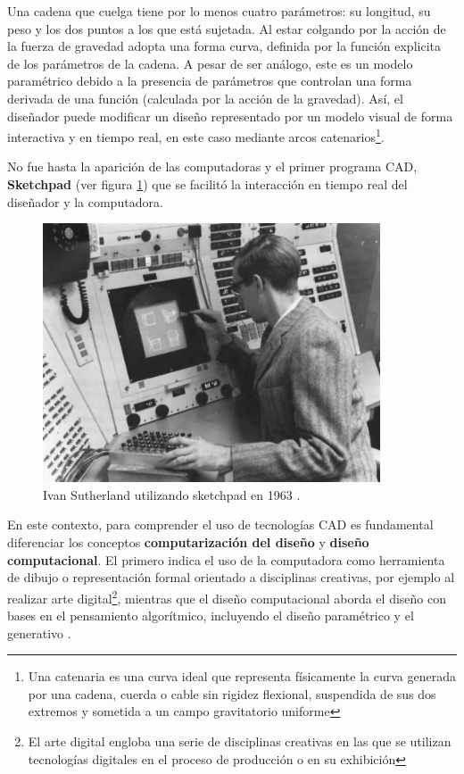 Una cadena que cuelga tiene por lo menos cuatro parámetros: su longitud, su peso y los dos puntos a los que está sujetada. Al estar colgando por la acción de la fuerza de gravedad adopta una forma curva, definida por la función explicita de los parámetros de la cadena. A pesar de ser análogo, este es un modelo paramétrico debido a la presencia de parámetros que controlan una forma derivada de una función (calculada por la acción de la gravedad). Así, el diseñador puede modificar  un diseño representado por un modelo visual de forma interactiva y en tiempo real, en este caso mediante arcos catenarios\footnote{Una catenaria es una curva ideal que representa físicamente la curva generada por una cadena, cuerda o cable sin rigidez flexional, suspendida de sus dos extremos y sometida a un campo gravitatorio uniforme}.

No fue hasta la aparición de las computadoras y el primer programa CAD, \textbf{Sketchpad} \citep{Sutherland:1963:SMG:1461551.1461591} (ver figura \ref{img:sketchpad}) que se facilitó la interacción en tiempo real del diseñador y la computadora.

\begin{figure}[ht]
\includegraphics[width=10cm]{Img/GEO/geo-sketchpadc.jpg}
\centering
\caption{\footnotesize{Ivan Sutherland utilizando sketchpad en 1963 \citep{evolved2017}.
}}
\label{img:sketchpad}
\end{figure}



En este contexto, para comprender el uso de tecnologías CAD es fundamental diferenciar  los conceptos  \textbf{computarización del diseño} y  \textbf{diseño computacional}. El primero indica el uso de la computadora como herramienta de dibujo o representación formal orientado a disciplinas creativas, por ejemplo al realizar arte digital\footnote{El arte digital engloba una serie de disciplinas creativas en las que se utilizan tecnologías digitales en el proceso de producción o en su exhibición}, mientras que el diseño computacional aborda el diseño con bases en el pensamiento algorítmico, incluyendo el diseño paramétrico y el generativo \citep{Kaled2016}.



